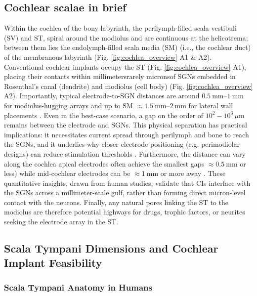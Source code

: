 \documentclass[referee,pdflatex, sn-vancouver-num]{sn-jnl}%
\theoremstyle{thmstyleone}%
\theoremstyle{thmstyletwo}%
\theoremstyle{thmstylethree}%
\newcommand{\um}{\ensuremath{\,\mu\mathrm{m}}}
\begin{document}
\subsection{Cochlear scalae in brief}  
Within the cochlea of the bony labyrinth, the perilymph-filled scala vestibuli (SV) and ST, spiral around the modiolus and are continuous at the helicotrema; between them lies the endolymph-filled scala media (SM) (i.e., the cochlear duct) of the membranous labyrinth (Fig. \ref{fig:cochlea_overview} A1 \& A2). Conventional cochlear implants occupy the ST (Fig. \ref{fig:cochlea_overview} A1), placing their contacts within millimeters\textemdash rarely microns\textemdash of SGNs embedded in Rosenthal's canal (dendrite) and modiolus (cell body) (Fig. \ref{fig:cochlea_overview} A2). Importantly, typical electrode-to-SGN distances are around $\SIrange{0.5}{1}{\mm}$ for modiolus-hugging arrays and up to SM $\approx \SIrange{1.5}{2}{\mm}$ for lateral wall placements \cite{Davis2016}. Even in the best-case scenario, a gap on the order of $10^{2}-10^{3}{\um}$ remains between the electrode and SGNs. This physical separation has practical implications: it necessitates current spread through perilymph and bone to reach the SGNs, and it underlies why closer electrode positioning (e.g. perimodiolar designs) can reduce stimulation thresholds \cite{Kawano1998}. Furthermore, the distance can vary along the cochlea \textemdash apical electrodes often achieve the smallest gaps $\approx \SI{0.5}\mm$ or less) while mid-cochlear electrodes can be $\approx \SI{1}\mm$ or more away \cite{Long2014}. These quantitative insights, drawn from human studies, validate that CIs interface with the SGNs across a millimeter-scale gulf, rather than forming direct micron-level contact with the neurons. Finally, any natural pores linking the ST to the modiolus are therefore potential highways for drugs, trophic factors, or neurites seeking the electrode array in the ST.

\subsection{Scala Tympani Dimensions and Cochlear Implant Feasibility}
\subsubsection{Scala Tympani Anatomy in Humans}
\end{document}
